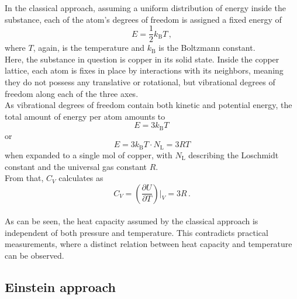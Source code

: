In the classical approach, assuming a uniform distribution of energy inside the substance, each of the atom's degrees of freedom is assigned a fixed energy of
\begin{equation*}
    E = \frac{1}{2} k_\text{B} T \,,
\end{equation*}
where $T$, again, is the temperature and $k_\text{B}$ is the Boltzmann constant. \\

Here, the substance in question is copper in its solid state.
Inside the copper lattice, each atom is fixes in place by interactions with its neighbors, meaning they do not possess any translative or rotational, but vibrational degrees of freedom along each of the three axes. \\
As vibrational degrees of freedom contain both kinetic and potential energy, the total amount of energy per atom amounts to
\begin{equation*}
    E = 3 k_\text{B} T \,
\end{equation*}
or
\begin{equation*}
    E = 3 k_\text{B} T \cdot N_\text{L} = 3 R T
\end{equation*}
when expanded to a single mol of copper, with $N_\text{L}$ describing the Loschmidt constant and the universal gas constant $R$.\\
From that, $C_V$ calculates as
\begin{equation*}
    C_V = \left( \frac{\partial U}{\partial T} \right) \big \vert _V = 3 R \,.
\end{equation*} \\

As can be seen, the heat capacity assumed by the classical approach is independent of both pressure and temperature.
This contradicts practical measurements, where a distinct relation between heat capacity and temperature can be observed. 

\subsection{Einstein approach}